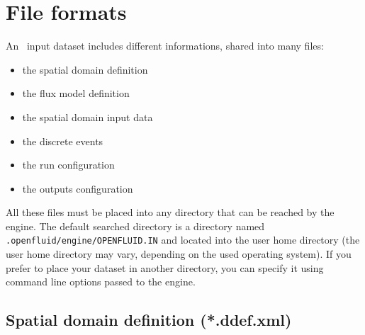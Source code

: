 \chapter{File formats}


An \OFEname \ input dataset includes different informations, shared into many
files:
\begin{itemize}
  \item the spatial domain definition
  \item the flux model definition
  \item the spatial domain input data 
  \item the discrete events
  \item the run configuration
  \item the outputs configuration
\end{itemize}

All these files must be placed into any directory that can be reached by the
engine. The default searched directory is a directory named
\texttt{.openfluid/engine/OPENFLUID.IN} and located into the user home
directory (the user home directory may vary, depending on the used operating
system). If you prefer to place your dataset in another directory, you can
specify it using command line options passed to the engine.


\section{Spatial domain definition (*.ddef.xml)}

